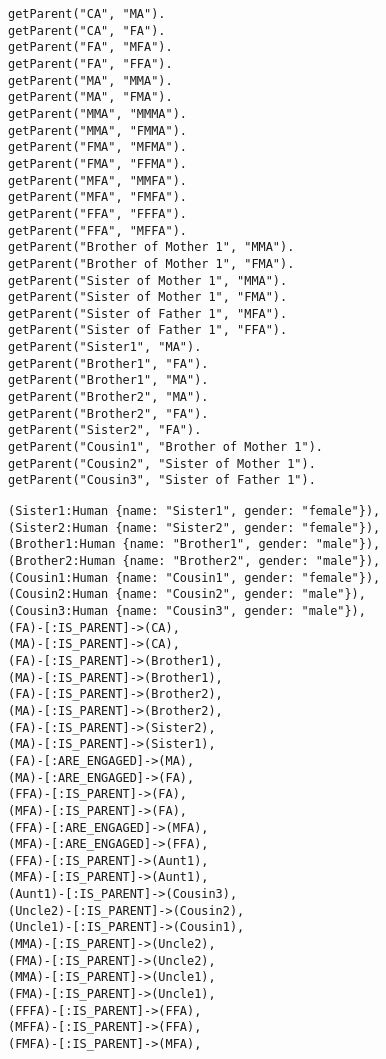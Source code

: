 \noindent\begin{minipage}[T]{.45\textwidth}
	\begin{lstlisting}[caption=Prolog (Продолжение)]
getParent("CA", "MA").
getParent("CA", "FA").		
getParent("FA", "MFA").
getParent("FA", "FFA").
getParent("MA", "MMA").
getParent("MA", "FMA").
getParent("MMA", "MMMA").
getParent("MMA", "FMMA").
getParent("FMA", "MFMA").
getParent("FMA", "FFMA").
getParent("MFA", "MMFA").
getParent("MFA", "FMFA").	
getParent("FFA", "FFFA").
getParent("FFA", "MFFA").
getParent("Brother of Mother 1", "MMA").
getParent("Brother of Mother 1", "FMA").
getParent("Sister of Mother 1", "MMA").
getParent("Sister of Mother 1", "FMA").
getParent("Sister of Father 1", "MFA").
getParent("Sister of Father 1", "FFA").
getParent("Sister1", "MA").
getParent("Brother1", "FA").
getParent("Brother1", "MA").
getParent("Brother2", "MA").
getParent("Brother2", "FA").
getParent("Sister2", "FA").
getParent("Cousin1", "Brother of Mother 1").
getParent("Cousin2", "Sister of Mother 1").
getParent("Cousin3", "Sister of Father 1").			
	\end{lstlisting}
\end{minipage}\hfill
\begin{minipage}[T]{.5\textwidth}
	\begin{lstlisting}[caption=Neo4j (Продолжение)]
(Sister1:Human {name: "Sister1", gender: "female"}),
(Sister2:Human {name: "Sister2", gender: "female"}),
(Brother1:Human {name: "Brother1", gender: "male"}),
(Brother2:Human {name: "Brother2", gender: "male"}),
(Cousin1:Human {name: "Cousin1", gender: "female"}),
(Cousin2:Human {name: "Cousin2", gender: "male"}),
(Cousin3:Human {name: "Cousin3", gender: "male"}),
(FA)-[:IS_PARENT]->(CA),
(MA)-[:IS_PARENT]->(CA),
(FA)-[:IS_PARENT]->(Brother1),
(MA)-[:IS_PARENT]->(Brother1),
(FA)-[:IS_PARENT]->(Brother2),
(MA)-[:IS_PARENT]->(Brother2),
(FA)-[:IS_PARENT]->(Sister2),
(MA)-[:IS_PARENT]->(Sister1),
(FA)-[:ARE_ENGAGED]->(MA),
(MA)-[:ARE_ENGAGED]->(FA),
(FFA)-[:IS_PARENT]->(FA),
(MFA)-[:IS_PARENT]->(FA),
(FFA)-[:ARE_ENGAGED]->(MFA),
(MFA)-[:ARE_ENGAGED]->(FFA),
(FFA)-[:IS_PARENT]->(Aunt1),
(MFA)-[:IS_PARENT]->(Aunt1),
(Aunt1)-[:IS_PARENT]->(Cousin3),
(Uncle2)-[:IS_PARENT]->(Cousin2),
(Uncle1)-[:IS_PARENT]->(Cousin1),
(MMA)-[:IS_PARENT]->(Uncle2),
(FMA)-[:IS_PARENT]->(Uncle2),
(MMA)-[:IS_PARENT]->(Uncle1),
(FMA)-[:IS_PARENT]->(Uncle1),
(FFFA)-[:IS_PARENT]->(FFA),
(MFFA)-[:IS_PARENT]->(FFA),
(FMFA)-[:IS_PARENT]->(MFA),	
	\end{lstlisting}
\end{minipage}

